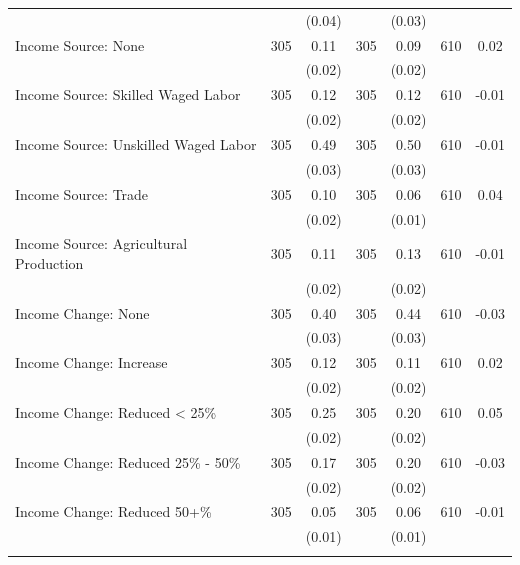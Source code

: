 \begin{tabular}{@{\extracolsep{5pt}}lcccccc}
 &   & (0.04)  &   & (0.03)  &   &  \\ [1ex]
Income Source: None   & 305    & 0.11    & 305    & 0.09    & 610    & 0.02   \\
 &   & (0.02)  &   & (0.02)  &   &  \\ [1ex]
Income Source: Skilled Waged Labor   & 305    & 0.12    & 305    & 0.12    & 610    & -0.01   \\
 &   & (0.02)  &   & (0.02)  &   &  \\ [1ex]
Income Source: Unskilled Waged Labor   & 305    & 0.49    & 305    & 0.50    & 610    & -0.01   \\
 &   & (0.03)  &   & (0.03)  &   &  \\ [1ex]
Income Source: Trade   & 305    & 0.10    & 305    & 0.06    & 610    & 0.04   \\
 &   & (0.02)  &   & (0.01)  &   &  \\ [1ex]
Income Source: Agricultural Production   & 305    & 0.11    & 305    & 0.13    & 610    & -0.01   \\
 &   & (0.02)  &   & (0.02)  &   &  \\ [1ex]
Income Change: None   & 305    & 0.40    & 305    & 0.44    & 610    & -0.03   \\
 &   & (0.03)  &   & (0.03)  &   &  \\ [1ex]
Income Change: Increase   & 305    & 0.12    & 305    & 0.11    & 610    & 0.02   \\
 &   & (0.02)  &   & (0.02)  &   &  \\ [1ex]
Income Change: Reduced < 25\%   & 305    & 0.25    & 305    & 0.20    & 610    & 0.05   \\
 &   & (0.02)  &   & (0.02)  &   &  \\ [1ex]
Income Change: Reduced 25\% - 50\%   & 305    & 0.17    & 305    & 0.20    & 610    & -0.03   \\
 &   & (0.02)  &   & (0.02)  &   &  \\ [1ex]
Income Change: Reduced 50+\%   & 305    & 0.05    & 305    & 0.06    & 610    & -0.01   \\
 &   & (0.01)  &   & (0.01)  &   &  \\ [1ex]
\hline \hline \\[-1.8ex]

\end{tabular}
